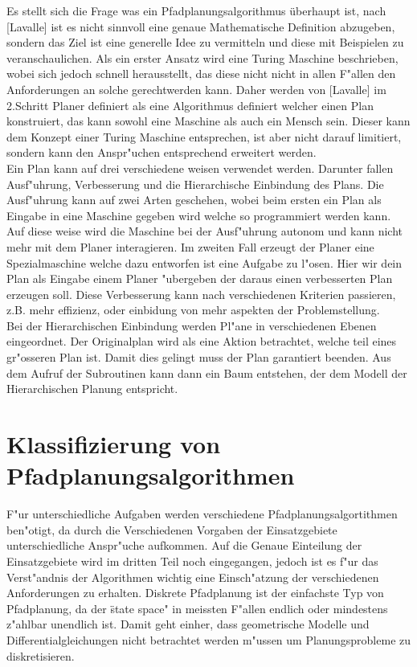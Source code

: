 Es stellt sich die Frage was ein Pfadplanungsalgorithmus überhaupt ist, nach [Lavalle] ist es nicht sinnvoll eine genaue Mathematische Definition abzugeben, sondern das Ziel ist eine generelle Idee zu vermitteln und diese mit Beispielen zu veranschaulichen.
Als ein erster Ansatz wird eine Turing Maschine beschrieben, wobei sich jedoch schnell herausstellt, das diese nicht nicht in allen F"allen den Anforderungen an solche gerechtwerden kann. 
Daher werden von [Lavalle] im 2.Schritt Planer definiert als eine Algorithmus definiert welcher einen Plan konstruiert, das kann sowohl eine Maschine als auch ein Mensch sein.
Dieser kann dem Konzept einer Turing Maschine entsprechen, ist aber nicht darauf limitiert, sondern kann den Anspr"uchen entsprechend erweitert werden.
\newline\\
Ein Plan kann auf drei verschiedene weisen verwendet werden. Darunter fallen Ausf"uhrung, Verbesserung und die Hierarchische Einbindung des Plans.
Die Ausf"uhrung kann auf zwei Arten geschehen, wobei beim ersten ein Plan als Eingabe in eine Maschine gegeben wird welche so programmiert werden kann. Auf diese weise wird die Maschine bei der Ausf"uhrung autonom und kann nicht mehr mit dem Planer interagieren. 
Im zweiten Fall erzeugt der Planer eine Spezialmaschine welche dazu entworfen ist eine Aufgabe zu l"osen. 
Hier wir dein Plan als Eingabe einem Planer "ubergeben der daraus einen verbesserten Plan erzeugen soll.
Diese Verbesserung kann nach verschiedenen Kriterien passieren, z.B. mehr effizienz, oder einbidung von mehr aspekten der Problemstellung.
\newline\\
Bei der Hierarchischen Einbindung werden Pl"ane in verschiedenen Ebenen eingeordnet. 
Der Originalplan wird als eine Aktion betrachtet,
 welche teil eines gr"osseren Plan ist. Damit dies
  gelingt muss der Plan garantiert beenden.
Aus dem Aufruf der Subroutinen kann dann ein Baum entstehen, der dem Modell der Hierarchischen Planung entspricht.\newline

\section{Klassifizierung von Pfadplanungsalgorithmen}

F"ur unterschiedliche Aufgaben werden verschiedene Pfadplanungsalgortithmen ben"otigt, da durch die Verschiedenen Vorgaben der Einsatzgebiete unterschiedliche Anspr"uche aufkommen. 
Auf die Genaue Einteilung der Einsatzgebiete wird im dritten Teil noch eingegangen, jedoch ist es f"ur das Verst"andnis der Algorithmen wichtig eine Einsch"atzung der verschiedenen Anforderungen zu erhalten. 
Diskrete Pfadplanung ist der einfachste Typ von Pfadplanung, da der \"state space" in meissten F"allen endlich oder mindestens z"ahlbar unendlich ist. \newline
Damit geht einher, dass geometrische Modelle und Differentialgleichungen nicht betrachtet werden m"ussen um Planungsprobleme zu diskretisieren. 
